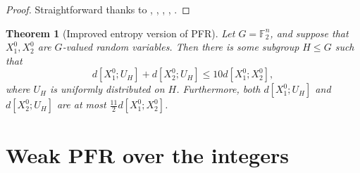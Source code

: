 \documentclass[10pt,a4paper]{article}
\newtheorem{theorem}{Theorem}
\newcommand{\lean}[1]{}
\newcommand{\uses}[1]{}
\newcommand{\leanok}{}
\newcommand{\chapter}[1]{\section{#1}}
\newcommand{\F}{\mathbb{F}}
\begin{document}
\begin{proof}\uses{copy-ent, ruz-copy, ruz-indep, cond-dist-def, conditional-entropy-def}\leanok Straightforward thanks to , , , , .
\end{proof}


\begin{theorem}[Improved entropy version of PFR]\label{entropy-pfr-improv}\lean{entropic_PFR_conjecture_improv}\leanok
  Let $G = \F_2^n$, and suppose that $X^0_1, X^0_2$ are $G$-valued random variables.
  Then there is some subgroup $H \leq G$ such that
  \[
    d[X^0_1;U_H] + d[X^0_2;U_H] \le 10 d[X^0_1;X^0_2],
  \]
  where $U_H$ is uniformly distributed on $H$.
  Furthermore, both $d[X^0_1;U_H]$ and $d[X^0_2;U_H]$ are at most $\tfrac{11}{2} d[X^0_1;X^0_2]$.
\end{theorem}

\chapter{Weak PFR over the integers}
\end{document}
